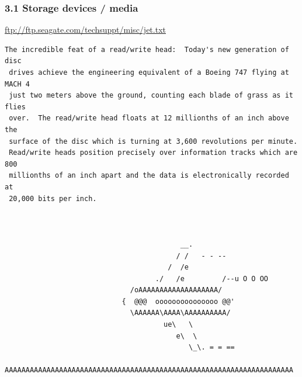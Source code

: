 \begin{frame}[fragile]
  \frametitle{3.1 Storage devices / media}
	\url{ftp://ftp.seagate.com/techsuppt/misc/jet.txt}
  \begin{lstlisting}[basicstyle=\tiny]
 The incredible feat of a read/write head:  Today's new generation of disc
 drives achieve the engineering equivalent of a Boeing 747 flying at MACH 4
 just two meters above the ground, counting each blade of grass as it flies
 over.  The read/write head floats at 12 millionths of an inch above the
 surface of the disc which is turning at 3,600 revolutions per minute.
 Read/write heads position precisely over information tracks which are 800
 millionths of an inch apart and the data is electronically recorded at
 20,000 bits per inch.



                                          __.
                                         / /   - - --
                                       /  /e
                                    ./   /e         /--u O O OO
                              /oAAAAAAAAAAAAAAAAAAA/ 
                            {  @@@  ooooooooooooooo @@'
                              \AAAAAA\AAAA\AAAAAAAAAA/
                                      ue\   \
                                         e\  \
                                            \_\. = = ==

AAAAAAAAAAAAAAAAAAAAAAAAAAAAAAAAAAAAAAAAAAAAAAAAAAAAAAAAAAAAAAAAAAAAA
  \end{lstlisting}
\end{frame}


